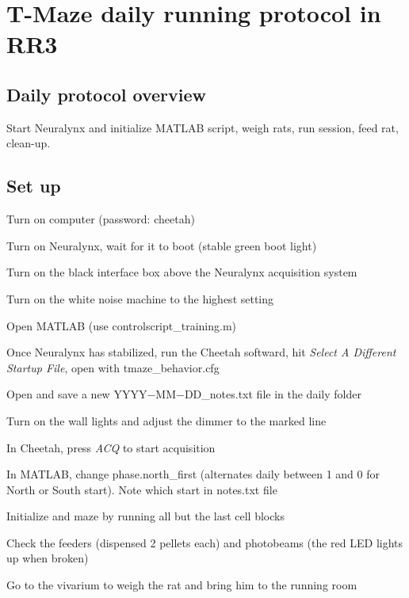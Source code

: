 \documentclass[10pt]{article}
\begin{document}
\section*{T-Maze daily running protocol in RR3}
\subsection*{Daily protocol overview}
Start Neuralynx and initialize MATLAB script, weigh rats, run session, feed rat, clean-up.

\subsection*{Set up}
\begin{todolist}[topsep=0pt,itemsep=-1ex,partopsep=1ex,parsep=1ex]
\item Turn on computer (password: cheetah)
\item Turn on Neuralynx, wait for it to boot (stable green boot light)
\item Turn on the black interface box above the Neuralynx acquisition system
\item Turn on the white noise machine to the highest setting
\item Open MATLAB (use controlscript\_training.m)
\item Once Neuralynx has stabilized, run the Cheetah softward, hit \textsl{Select A Different Startup File}, open with tmaze\_behavior.cfg
\item Open and save a new YYYY$-$MM$-$DD\_notes.txt file in the daily folder
\item Turn on the wall lights and adjust the dimmer to the marked line
\item In Cheetah, press \textsl{ACQ} to start acquisition
\item In MATLAB, change phase.north\_first (alternates daily between 1 and 0 for North or South start). Note which start in notes.txt file
\item Initialize and maze by running all but the last cell blocks
\item Check the feeders (dispensed 2 pellets each) and photobeams (the red LED lights up when broken)
\item Go to the vivarium to weigh the rat and bring him to the running room
\end{todolist}
\end{document}
